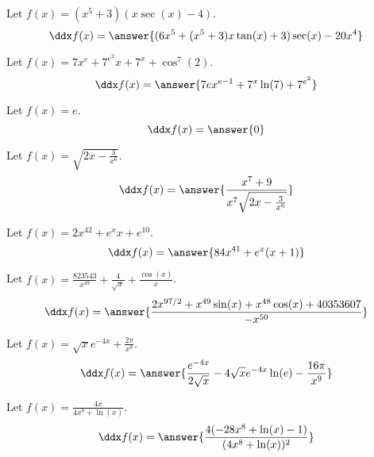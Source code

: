 \documentclass{ximera}
\begin{document}
\begin{shuffle}
\begin{exercise}
Let $f(x)=(x^5+3) (x \sec (x)-4)$.
\[
\ddx f(x) = \answer{(6 x^5+(x^5+3) x \tan (x)+3) \sec (x)-20 x^4}
\]
\end{exercise}

\begin{exercise}
Let $f(x)=7 x^e+7^{e^2} x+7^x+\cos ^7(2)$.
\[
\ddx f(x) = \answer{7 e x^{e-1}+7^x \ln (7)+7^{e^2}}
\]
\end{exercise}



\begin{exercise}
Let $f(x)=e$.
\[
\ddx f(x) = \answer{0}
\]
\end{exercise}

\begin{exercise}
Let $f(x)=\sqrt{2 x-\frac{3}{x^6}}$.
\[
\ddx f(x) = \answer{\frac{x^7+9}{x^7 \sqrt{2 x-\frac{3}{x^6}}}}
\]
\end{exercise}

\begin{exercise}
Let $f(x)=2 x^{42}+e^x x+e^{10}$.
\[
\ddx f(x) = \answer{84 x^{41}+e^x (x+1)}
\]
\end{exercise}

\begin{exercise}
Let $f(x)=\frac{823543}{x^{49}}+\frac{4}{\sqrt{x}}+\frac{\cos (x)}{x}$.
\[
\ddx f(x) = \answer{\frac{2 x^{97/2}+x^{49} \sin (x)+x^{48} \cos (x)+40353607}{-x^{50}}}
\]
\end{exercise}

\begin{exercise}
Let $f(x)=\sqrt{x} e^{-4 x}+\frac{2 \pi }{x^8}$.
\[
\ddx f(x) = \answer{\frac{e^{-4 x}}{2 \sqrt{x}}-4 \sqrt{x} e^{-4 x} \ln (e)-\frac{16 \pi }{x^9}}
\]
\end{exercise}

\begin{exercise}
Let $f(x)=\frac{4 x}{4 x^8+\ln (x)}$.
\[
\ddx f(x) = \answer{\frac{4 (-28 x^8+\ln (x)-1)}{(4 x^8+\ln (x))^2}}
\]
\end{exercise}


\end{shuffle}
\end{document}
